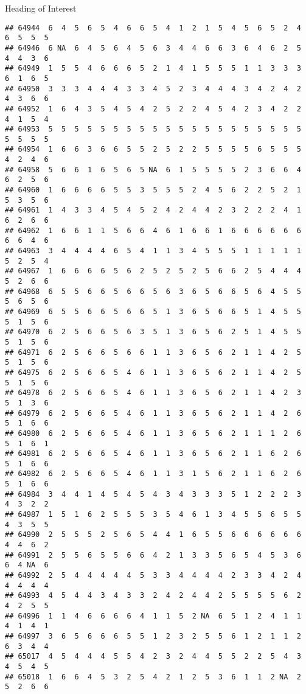 \documentclass[
  ignorenonframetext,
]{beamer}
\begin{document}
\begin{frame}[fragile]{Heading of Interest}
\begin{verbatim}
## 64944  6  4  5  6  5  4  6  6  5  4  1  2  1  5  4  5  6  5  2  4  6  5  5  5
## 64946  6 NA  6  4  5  6  4  5  6  3  4  4  6  6  3  6  4  6  2  5  4  4  3  6
## 64949  1  5  5  4  6  6  6  5  2  1  4  1  5  5  5  1  1  3  3  3  6  1  6  5
## 64950  3  3  3  4  4  4  3  3  4  5  2  3  4  4  4  3  4  2  4  2  4  3  6  6
## 64952  1  6  4  3  5  4  5  4  2  5  2  2  4  5  4  2  3  4  2  2  4  1  5  4
## 64953  5  5  5  5  5  5  5  5  5  5  5  5  5  5  5  5  5  5  5  5  5  5  5  5
## 64954  1  6  6  3  6  6  5  5  2  5  2  2  5  5  5  5  6  5  5  5  4  2  4  6
## 64958  5  6  6  1  6  5  6  5 NA  6  1  5  5  5  5  2  3  6  6  4  6  2  5  6
## 64960  1  6  6  6  6  5  5  3  5  5  5  2  4  5  6  2  2  5  2  1  5  3  5  6
## 64961  1  4  3  3  4  5  4  5  2  4  2  4  4  2  3  2  2  2  4  1  6  2  6  6
## 64962  1  6  6  1  1  5  6  6  4  6  1  6  6  1  6  6  6  6  6  6  6  6  4  6
## 64963  3  4  4  4  4  6  5  4  1  1  3  4  5  5  5  1  1  1  1  1  5  2  5  4
## 64967  1  6  6  6  6  5  6  2  5  2  5  2  5  6  6  2  5  4  4  4  5  2  6  6
## 64968  6  5  5  6  6  5  6  6  5  6  3  6  5  6  6  5  6  4  5  5  5  6  5  6
## 64969  6  5  5  6  6  5  6  6  5  1  3  6  5  6  6  5  1  4  5  5  5  1  5  6
## 64970  6  2  5  6  6  5  6  3  5  1  3  6  5  6  2  5  1  4  5  5  5  1  5  6
## 64971  6  2  5  6  6  5  6  6  1  1  3  6  5  6  2  1  1  4  2  5  5  1  5  6
## 64975  6  2  5  6  6  5  4  6  1  1  3  6  5  6  2  1  1  4  2  5  5  1  5  6
## 64978  6  2  5  6  6  5  4  6  1  1  3  6  5  6  2  1  1  4  2  3  5  1  3  6
## 64979  6  2  5  6  6  5  4  6  1  1  3  6  5  6  2  1  1  4  2  6  5  1  6  6
## 64980  6  2  5  6  6  5  4  6  1  1  3  6  5  6  2  1  1  1  2  6  5  1  6  1
## 64981  6  2  5  6  6  5  4  6  1  1  3  6  5  6  2  1  1  6  2  6  5  1  6  6
## 64982  6  2  5  6  6  5  4  6  1  1  3  1  5  6  2  1  1  6  2  6  5  1  6  6
## 64984  3  4  4  1  4  5  4  5  4  3  4  3  3  3  5  1  2  2  2  3  4  3  2  2
## 64987  1  5  1  6  2  5  5  5  3  5  4  6  1  3  4  5  5  6  5  5  4  3  5  5
## 64990  2  5  5  5  2  5  6  5  4  4  1  6  5  5  6  6  6  6  6  6  4  4  6  2
## 64991  2  5  5  6  5  5  6  6  4  2  1  3  3  5  6  5  4  5  3  6  6  4 NA  6
## 64992  2  5  4  4  4  4  4  5  3  3  4  4  4  4  2  3  3  4  2  4  4  4  4  4
## 64993  4  5  4  4  3  4  3  3  2  4  2  4  4  2  5  5  5  5  6  2  4  2  5  5
## 64996  1  1  4  6  6  6  6  4  1  1  5  2 NA  6  5  1  2  4  1  1  4  1  4  1
## 64997  3  6  5  6  6  6  5  5  1  2  3  2  5  5  6  1  2  1  1  2  6  3  4  4
## 65017  4  5  4  4  4  5  5  4  2  3  2  4  4  5  5  2  2  5  4  3  4  5  4  5
## 65018  1  6  6  4  5  3  2  5  4  2  1  2  5  3  6  1  1  2 NA  2  5  2  6  6

\end{verbatim}
\end{frame}
\end{document}
